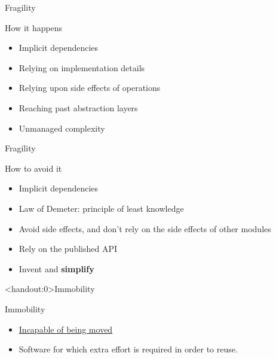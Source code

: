 \documentclass[xcolor=svgnames]{beamer}
\begin{document}
{%
%
\begin{frame}{Fragility}

    How it happens
    \begin{itemize}
        \item<1-> Implicit dependencies
        \item<2-> Relying on implementation details
        \item<3-> Relying upon side effects of operations
        \item<4-> Reaching past abstraction layers
        \item<5-> Unmanaged complexity
    \end{itemize}
\end{frame}
}


{%
%
\begin{frame}{Fragility}

    How to avoid it
    \begin{itemize}
        \item<1-> Implicit dependencies
        \item<2-> Law of Demeter: principle of least knowledge
        \item<3-> Avoid side effects, and don't rely on the side effects of
            other modules
        \item<4-> Rely on the published API
        \item<5-> Invent and \textbf{simplify}
    \end{itemize}
\end{frame}
}


{%
%
\begin{frame}<handout:0>{Immobility}
\end{frame}
}

{%
%
\begin{frame}{Immobility}

    \begin{itemize}
        \item \href{https://www.merriam-webster.com/dictionary/immobile}
            {Incapable of being moved}
        \item<2-> Software for which extra effort is required in order to reuse.
    \end{itemize}
\end{frame}
}
\end{document}
